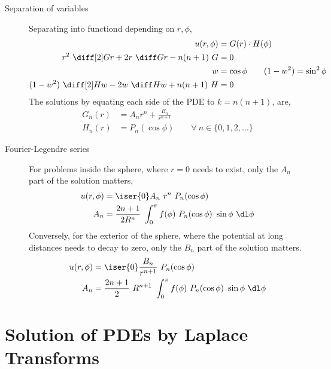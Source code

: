 \begin{description}
    \item[Separation of variables] Separating into functiond depending on $ r, \phi $,
        \begin{align}
            u(r, \phi)                 & = G(r) \cdot H(\phi)                    \\
            r^2\ \diff[2] Gr
            + 2r\ \diff Gr - n(n+1)\ G & = 0                                     \\
            w                          & = \cos \phi \qquad (1-w^2) = \sin^2\phi \\
            (1-w^2)\ \diff[2]Hw
            - 2w\ \diff Hw + n(n+1)\ H & = 0
        \end{align}
        The solutions by equating each side of the PDE to $ k = n(n+1) $, are,
        \begin{align}
            G_n(r) & = A_n r^n + \frac{B_n}{r^{n+1}}                          \\
            H_n(r) & = P_n(\cos\phi) \qquad \forall\ n \in \{0, 1, 2, \dots\}
        \end{align}

    \item[Fourier-Legendre series] For problems inside the sphere, where $ r=0 $
        needs to exist, only the $ A_n $ part of the solution matters,
        \begin{align}
            u(r, \phi) & = \iser{0} A_n\ r^n\ P_n(\cos\phi)                          \\
            A_n        & = \frac{2n+1}{2R^n}\ \int_{0}^{\pi} f(\phi)\ P_n(\cos \phi)
            \ \sin\phi\ \dl \phi
        \end{align}
        Conversely, for the exterior of the sphere, where the potential at long distances
        needs to decay to zero, only the $ B_n $ part of the solution matters.
        \begin{align}
            u(r, \phi) & = \iser{0} \frac{B_n}{r^{n+1}}\ P_n(\cos\phi) \\
            A_n        & = \frac{2n+1}{2}\ R^{n+1}
            \ \int_{0}^{\pi} f(\phi)\ P_n(\cos \phi) \ \sin\phi\ \dl \phi
        \end{align}
\end{description}

\section{Solution of PDEs by Laplace Transforms}

